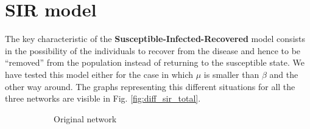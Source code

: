 
\section{SIR model} %
\label{sec:sir_model}
    The key characteristic of the \textbf{Susceptible-Infected-Recovered} model consists in the possibility
    of the individuals to recover from the disease and hence to be ``removed'' from the population instead of returning to the susceptible state.
    We have tested this model either for the case in which $\mu$ is smaller than $\beta$ and the other way around. The graphs representing this different situations for all the three networks are visible in Fig. \ref{fig:diff_sir_total}.

    \begin{figure}
        \begin{subfigure}{0.45\textwidth}
            \caption{Original network}
            \label{diff_sir_smaller}
        \end{subfigure}
        \begin{subfigure}{0.45\textwidth}
\end{subfigure}
\end{figure}
